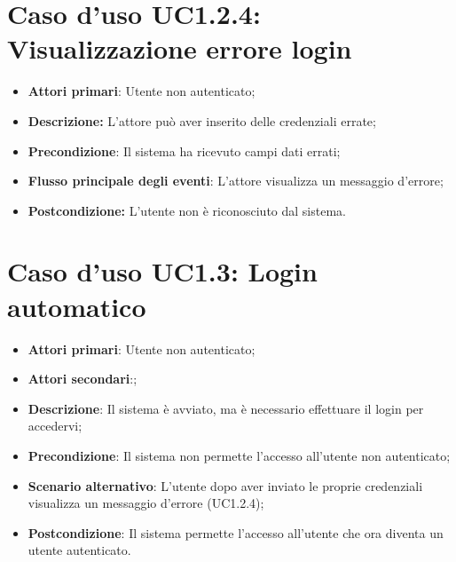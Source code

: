 \section{Caso d'uso UC1.2.4: Visualizzazione errore login}
\begin{itemize}
	\item \textbf{Attori primari}: Utente non autenticato;
	\item \textbf{Descrizione:} L'attore può aver inserito delle credenziali errate;
	\item \textbf{Precondizione}: Il sistema ha ricevuto campi dati errati;
	\item \textbf{Flusso principale degli eventi}: L'attore visualizza un messaggio d'errore;
	\item \textbf{Postcondizione:} L'utente non è riconosciuto dal sistema.
\end{itemize}
\section{Caso d'uso UC1.3: Login automatico}
\begin{itemize}
	\item \textbf{Attori primari}: Utente non autenticato;
	\item \textbf{Attori secondari}:;
	\item \textbf{Descrizione}: Il sistema è avviato, ma è necessario effettuare il login per accedervi;
	\item \textbf{Precondizione}: Il sistema non permette l'accesso all'utente non autenticato;
	\item \textbf{Scenario alternativo}: L'utente dopo aver inviato le proprie credenziali visualizza un messaggio d'errore (UC1.2.4);
	\item \textbf{Postcondizione}: Il sistema permette l'accesso all'utente che ora diventa un utente autenticato.
\end{itemize}
